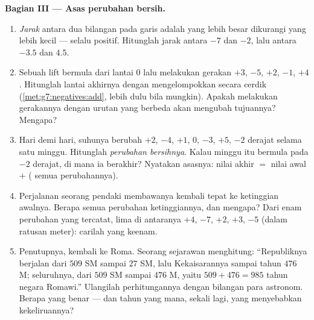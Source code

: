\begin{problem}
\medskip
\noindent\textbf{Bagian III --- Asas perubahan bersih.}
\begin{enumerate}[resume]
  \item \emph{Jarak} antara dua bilangan pada garis adalah yang lebih
        besar dikurangi yang lebih kecil --- selalu positif.
        Hitunglah jarak antara $-7$ dan $-2$, lalu antara $-3.5$ dan
        $4.5$.
  \item Sebuah lift bermula dari lantai $0$ lalu melakukan gerakan
        $+3$, $-5$, $+2$, $-1$, $+4$. Hitunglah lantai akhirnya
        dengan mengelompokkan secara cerdik
        (\cref{met:g7:negatives:add},  lebih dulu bila mungkin).
        Apakah melakukan gerakannya dengan urutan yang berbeda akan
        mengubah tujuannya? Mengapa?
  \item Hari demi hari, suhunya berubah $+2$, $-4$, $+1$, $0$, $-3$,
        $+5$, $-2$ derajat selama satu minggu. Hitunglah
        \emph{perubahan bersihnya}. Kalau minggu itu bermula pada
        $-2$ derajat, di mana ia berakhir? Nyatakan asasnya: nilai
        akhir $=$ nilai awal $+$ ( semua perubahannya).
  \item Perjalanan seorang pendaki membawanya kembali tepat ke
        ketinggian awalnya. Berapa  semua perubahan
        ketinggiannya, dan mengapa? Dari enam perubahan yang
        tercatat, lima di antaranya $+4$, $-7$, $+2$, $+3$, $-5$
        (dalam ratusan meter): carilah yang keenam.
  \item Penutupnya, kembali ke Roma. Seorang sejarawan menghitung:
        ``Republiknya berjalan dari $509$ SM sampai $27$ SM, lalu
        Kekaisarannya sampai tahun $476$ M; seluruhnya, dari $509$ SM
        sampai $476$ M, yaitu $509 + 476 = 985$ tahun negara Romawi.''
        Ulangilah perhitungannya dengan bilangan para astronom. Berapa
         yang benar --- dan tahun yang mana, sekali lagi, yang
        menyebabkan kekeliruannya?

\end{enumerate}
\end{problem}
